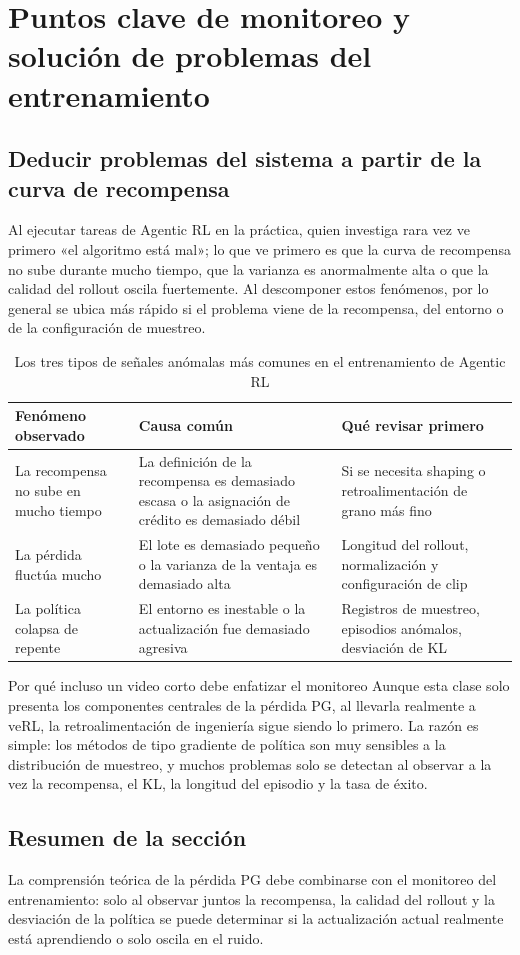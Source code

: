 \section{Puntos clave de monitoreo y solución de problemas del entrenamiento}
\subsection{Deducir problemas del sistema a partir de la curva de recompensa}
Al ejecutar tareas de Agentic RL en la práctica, quien investiga rara vez ve primero «el algoritmo está mal»; lo que ve primero es que la curva de recompensa no sube durante mucho tiempo, que la varianza es anormalmente alta o que la calidad del rollout oscila fuertemente. Al descomponer estos fenómenos, por lo general se ubica más rápido si el problema viene de la recompensa, del entorno o de la configuración de muestreo.

\begin{table}[H]
\centering
\begin{tabular}{p{3.5cm}p{5cm}p{4.5cm}}
\toprule
Fenómeno observado & Causa común & Qué revisar primero \\
\midrule
La recompensa no sube en mucho tiempo & La definición de la recompensa es demasiado escasa o la asignación de crédito es demasiado débil & Si se necesita shaping o retroalimentación de grano más fino \\
La pérdida fluctúa mucho & El lote es demasiado pequeño o la varianza de la ventaja es demasiado alta & Longitud del rollout, normalización y configuración de clip \\
La política colapsa de repente & El entorno es inestable o la actualización fue demasiado agresiva & Registros de muestreo, episodios anómalos, desviación de KL \\
\bottomrule
\end{tabular}
\caption{Los tres tipos de señales anómalas más comunes en el entrenamiento de Agentic RL}
\end{table}

\begin{knowledgebox}{Por qué incluso un video corto debe enfatizar el monitoreo}
Aunque esta clase solo presenta los componentes centrales de la pérdida PG, al llevarla realmente a veRL, la retroalimentación de ingeniería sigue siendo lo primero. La razón es simple: los métodos de tipo gradiente de política son muy sensibles a la distribución de muestreo, y muchos problemas solo se detectan al observar a la vez la recompensa, el KL, la longitud del episodio y la tasa de éxito.
\end{knowledgebox}

\subsection{Resumen de la sección}
La comprensión teórica de la pérdida PG debe combinarse con el monitoreo del entrenamiento: solo al observar juntos la recompensa, la calidad del rollout y la desviación de la política se puede determinar si la actualización actual realmente está aprendiendo o solo oscila en el ruido.

\newpage
